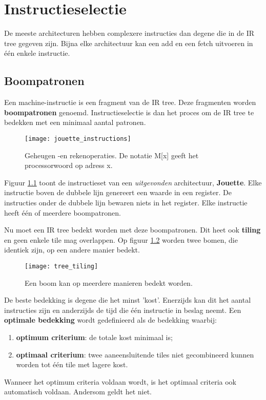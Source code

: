 \chapter{Instructieselectie}

De meeste architecturen hebben complexere instructies dan degene die in de IR tree gegeven zijn. Bijna elke architectuur kan een add en een fetch uitvoeren in één enkele instructie. 
\section{Boompatronen}
Een machine-instructie is een fragment van de IR tree. Deze fragmenten worden \textbf{boompatronen} genoemd. Instructieselectie is dan het proces om de IR tree te bedekken met een minimaal aantal patronen.

\begin{figure}
	\centering
	\texttt{[image: jouette\_instructions]}
	\caption{Geheugen -en rekenoperaties. De notatie M[x] geeft het processorwoord op adress x.}
	\label{fig:jouette_instructions}
\end{figure}

Figuur \ref{fig:jouette_instructions} toont de instructieset van een \textit{uitgevonden} architectuur, \textbf{Jouette}. Elke instructie boven de dubbele lijn genereert een waarde in een register. De instructies onder de dubbele lijn bewaren niets in het register. Elke instructie heeft één of meerdere boompatronen.

Nu moet een IR tree bedekt worden met deze boompatronen. Dit heet ook \textbf{tiling} en geen enkele tile mag overlappen. Op figuur \ref{fig:tree_tiling} worden twee bomen, die identiek zijn, op een andere manier bedekt. 

\begin{figure}
	\centering
	\texttt{[image: tree\_tiling]}
	\caption{Een boom kan op meerdere manieren bedekt worden.}
	\label{fig:tree_tiling}
\end{figure}
De beste bedekking is degene die het minst 'kost'. Enerzijds kan dit het aantal instructies zijn en anderzijds de tijd die één instructie in beslag neemt. Een \textbf{optimale bedekking} wordt gedefinieerd als de bedekking waarbij:
\begin{enumerate}
	\item \textbf{optimum criterium}: de totale kost minimaal is;
	\item \textbf{optimaal criterium}: twee aaneensluitende tiles niet gecombineerd kunnen worden tot één tile met lagere kost.
\end{enumerate}
Wanneer het optimum criteria voldaan wordt, is het optimaal criteria ook automatisch voldaan. Andersom geldt het niet.

